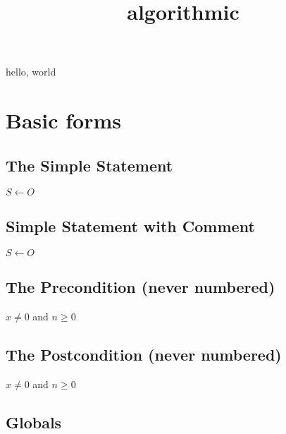 \documentclass{amsart}
\title{algorithmic}
\begin{document}
\maketitle

hello, world


\section{Basic forms}

\subsection{The Simple Statement}

\begin{algorithmic}[1]
    \STATE $S \leftarrow O$
\end{algorithmic}

\subsection{Simple Statement with Comment}

\begin{algorithmic}[1]
    \STATE $S \leftarrow O$ 
\end{algorithmic}

\subsection{The Precondition (never numbered)}

\begin{algorithmic}[1]
    \REQUIRE $x \neq 0$ and $n \geq 0$
\end{algorithmic}

\subsection{The Postcondition (never numbered)}

\begin{algorithmic}[1]
    \ENSURE $x \neq 0$ and $n \geq 0$
\end{algorithmic}

\subsection{Globals}
\end{document}

